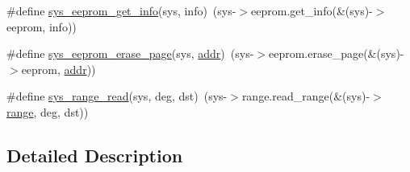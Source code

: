 \begin{DoxyCompactItemize}
\#define \hyperlink{group__syscalls_gabb1f6f6556538ee72c9432874eafcfbb}{sys\+\_\+eeprom\+\_\+get\+\_\+info}(sys, info)~(sys-\/$>$eeprom.\+get\+\_\+info(\&(sys)-\/$>$eeprom, info))
\item 
\#define \hyperlink{group__syscalls_gae1373dec4d5fd3dc59417c53064e75be}{sys\+\_\+eeprom\+\_\+erase\+\_\+page}(sys, \hyperlink{config_8c_a41a6aad09727eb120338c35535a652a6}{addr})~(sys-\/$>$eeprom.\+erase\+\_\+page(\&(sys)-\/$>$eeprom, \hyperlink{config_8c_a41a6aad09727eb120338c35535a652a6}{addr}))
\item 
\#define \hyperlink{group__syscalls_gacf3641764cf72ef5619025a1e753dfe0}{sys\+\_\+range\+\_\+read}(sys, deg, dst)~(sys-\/$>$range.\+read\+\_\+range(\&(sys)-\/$>$\hyperlink{config_2rx_8h_a53eac340462a61108eed07ba3e52e233}{range}, deg, dst))
\end{DoxyCompactItemize}


\subsection{Detailed Description}


